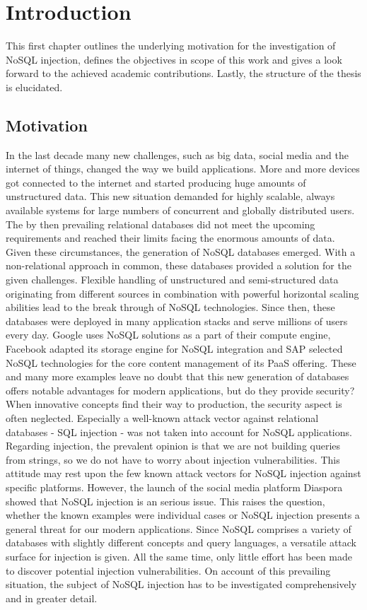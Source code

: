 \chapter{Introduction}
\label{cha:introduction}
This first chapter outlines the underlying motivation for the investigation of NoSQL injection, defines the objectives in scope of this work and gives a look forward to the achieved academic contributions. Lastly, the structure of the thesis is elucidated.

\section{Motivation}
In the last decade many new challenges, such as big data, social media and the internet of things, changed the way we build applications. More and more devices got connected to the internet and started producing huge amounts of unstructured data. This new situation demanded for highly scalable, always available systems for large numbers of concurrent and globally distributed users. The by then prevailing relational databases did not meet the upcoming requirements and reached their limits facing the enormous amounts of data. Given these circumstances, the generation of NoSQL databases emerged. With a non-relational approach in common, these databases provided a solution for the given challenges. Flexible handling of unstructured and semi-structured data originating from different sources in combination with powerful horizontal scaling abilities lead to the break through of NoSQL technologies. Since then, these databases were deployed in many application stacks and serve millions of users every day. Google uses NoSQL solutions as a part of their compute engine, Facebook adapted its storage engine for NoSQL integration and SAP selected NoSQL technologies for the core content management of its PaaS offering. These and many more examples leave no doubt that this new generation of databases offers notable advantages for modern applications, but do they provide security? When innovative concepts find their way to production, the security aspect is often neglected. Especially a well-known attack vector against relational databases - SQL injection - was not taken into account for NoSQL applications. Regarding injection, the prevalent opinion is that we are not building queries from strings, so we do not have to worry about injection vulnerabilities. This attitude may rest upon the few known attack vectors for NoSQL injection against specific platforms. However, the launch of the social media platform Diaspora showed that NoSQL injection is an serious issue. This raises the question, whether the known examples were individual cases or NoSQL injection presents a general threat for our modern applications. Since NoSQL comprises a variety of databases with slightly different concepts and query languages, a versatile attack surface for injection is given. All the same time, only little effort has been made to discover potential injection vulnerabilities. On account of this prevailing situation, the subject of NoSQL injection has to be investigated comprehensively and in greater detail.

